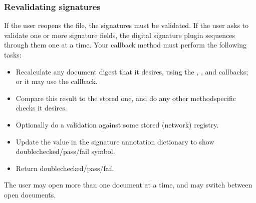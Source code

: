 \documentclass[letterpaper,12pt,english,openany,oneside]{sphinxmanual}
\begin{document}
\subsubsection{Revalidating signatures}
\label{\detokenize{Plugins_ExtendedAPI:revalidating-signatures}}
If the user reopens the file, the signatures must be validated. If the user asks to validate one or more signature fields, the digital signature plugin sequences through them one at a time. Your  callback method must perform the following tasks:
\begin{itemize}
\item {} 
Recalculate any document digest that it desires, using the , , and  callbacks; or it may use the  callback.

\item {} 
Compare this result to the stored one, and do any other method\sphinxhyphen{}specific checks it desires.

\item {} 
Optionally do a validation against some stored (network) registry.

\item {} 
Update the   value in the signature annotation dictionary to show doublechecked/pass/fail symbol.

\item {} 
Return doublechecked/pass/fail.

\end{itemize}

The user may open more than one document at a time, and may switch between open documents.
\end{document}
